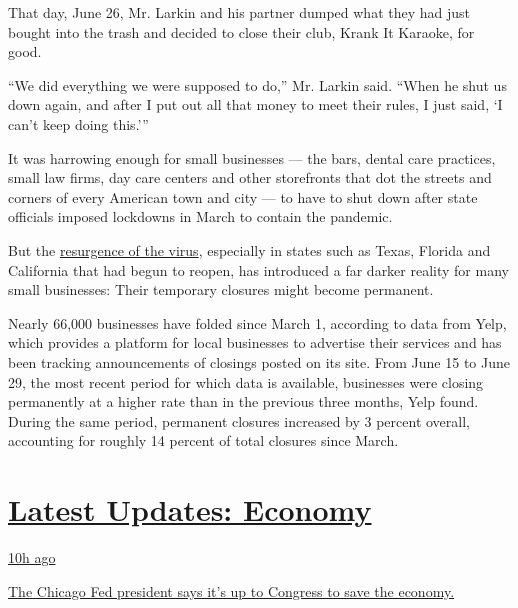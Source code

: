 That day, June 26, Mr. Larkin and his partner dumped what they had just
bought into the trash and decided to close their club, Krank It Karaoke,
for good.

``We did everything we were supposed to do,'' Mr. Larkin said. ``When he
shut us down again, and after I put out all that money to meet their
rules, I just said, `I can't keep doing this.'''

It was harrowing enough for small businesses --- the bars, dental care
practices, small law firms, day care centers and other storefronts that
dot the streets and corners of every American town and city --- to have
to shut down after state officials imposed lockdowns in March to contain
the pandemic.

But the
\href{https://www.nytimes.com/2020/06/26/us/coronavirus-florida-texas-bars-closing.html}{resurgence
of the virus}, especially in states such as Texas, Florida and
California that had begun to reopen, has introduced a far darker reality
for many small businesses: Their temporary closures might become
permanent.

Nearly 66,000 businesses have folded since March 1, according to data
from Yelp, which provides a platform for local businesses to advertise
their services and has been tracking announcements of closings posted on
its site. From June 15 to June 29, the most recent period for which data
is available, businesses were closing permanently at a higher rate than
in the previous three months, Yelp found. During the same period,
permanent closures increased by 3 percent overall, accounting for
roughly 14 percent of total closures since March.

\hypertarget{latest-updates-economy}{%
\section{\texorpdfstring{\href{https://www.nytimes.com/live/2020/08/03/business/stock-market-today-coronavirus?action=click\&pgtype=Article\&state=default\&region=MAIN_CONTENT_1\&context=storylines_live_updates}{Latest
Updates:
Economy}}{Latest Updates: Economy}}\label{latest-updates-economy}}

\href{https://www.nytimes.com/live/2020/08/03/business/stock-market-today-coronavirus?action=click\&pgtype=Article\&state=default\&region=MAIN_CONTENT_1\&context=storylines_live_updates\#the-chicago-fed-president-says-its-up-to-congress-to-save-the-economy}{10h
ago}

\href{https://www.nytimes.com/live/2020/08/03/business/stock-market-today-coronavirus?action=click\&pgtype=Article\&state=default\&region=MAIN_CONTENT_1\&context=storylines_live_updates\#the-chicago-fed-president-says-its-up-to-congress-to-save-the-economy}{The
Chicago Fed president says it's up to Congress to save the economy.}

